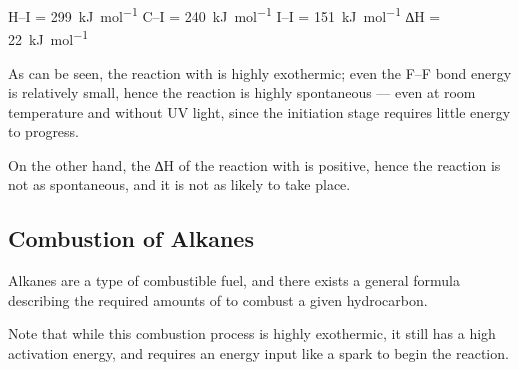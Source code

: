 				\vspace{1.0em}
				\vbox{
							\tabto{25mm}	H–I			\tabto{50mm} = \SI{299}{\kilo\joule\per\mole}
								\tabto{25mm}	C–I			\tabto{50mm} = \SI{240}{\kilo\joule\per\mole}
								\tabto{25mm}	I–I			\tabto{50mm} = \SI{151}{\kilo\joule\per\mole}
								\tabto{25mm}	∆H	\tabto{50mm} = \SI[retain-explicit-plus]{+22}{\kilo\joule\per\mole}
				}

				As can be seen, the reaction with  is highly exothermic; even the F–F bond energy is relatively small, hence the
				reaction is highly spontaneous --- even at room temperature and without UV light, since the initiation stage requires
				little energy to progress.

				On the other hand, the ∆H of the reaction with  is positive, hence the reaction is not as spontaneous, and it is not
				as likely to take place.



		\pagebreak
		\subsection{Combustion of Alkanes}

			Alkanes are a type of combustible fuel, and there exists a general formula describing the required amounts of 
			to combust a given hydrocarbon.


			Note that while this combustion process is highly exothermic, it still has a high activation energy, and requires an energy
			input like a spark to begin the reaction.


















